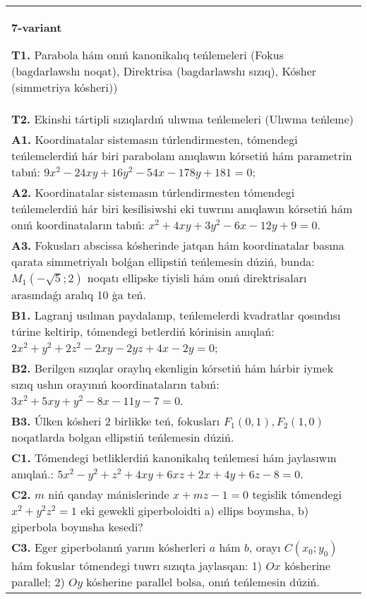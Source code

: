 \documentclass{article}
\begin{document}
\begin{tabular}{m{17cm}}
\textbf{7-variant}
\newline

\textbf{T1.} Parabola hám onıń kanonikalıq teńlemeleri (Fokus (bagdarlawshı noqat), Direktrisa (bagdarlawshı sızıq), Kósher (simmetriya kósheri)) \\
\textbf{T2.} Ekinshi tártipli sızıqlardıń ulıwma teńlemeleri (Ulıwma teńleme) \\
\textbf{A1.} Koordinatalar sistemasın túrlendirmesten, tómendegi teńlemelerdiń hár biri parabolanı anıqlawın kórsetiń hám parametrin tabıń: $9 x^2-24 x y+16 y^2-54 x-178 y+181=0$; \\
\textbf{A2.} Koordinatalar sistemasın túrlendirmesten tómendegi teńlemelerdiń hár biri kesilisiwshi eki tuwrını anıqlawın kórsetiń hám onıń koordinataların tabıń: $x^2+4 x y+3 y^2-6 x-12 y+9=0$. \\
\textbf{A3.} Fokusları abscissa kósherinde jatqan hám koordinatalar basına qarata simmetriyalı bolǵan ellipstiń teńlemesin dúziń, bunda: $M_1 (-\sqrt{5}; 2)$ noqatı ellipske tiyisli hám onıń direktrisaları arasındaǵı aralıq 10 ģa teń. \\
\textbf{B1.} Lagranj usılınan paydalanıp, teńlemelerdi kvadratlar qosındısı túrine keltirip, tómendegi betlerdiń kórinisin anıqlań: $2 x^2+y^2+2 z^2-2 x y-2 y z+4 x-2 y=0$; \\
\textbf{B2.} Berilgen sızıqlar oraylıq ekenligin kórsetiń hám hárbir iymek sızıq ushın orayınıń koordinataların tabıń: $3x^2+5xy+y^2-8x-11y-7=0$. \\
\textbf{B3.} Úlken kósheri 2 birlikke teń, fokusları $F_1 (0,1), F_2 (1,0) $ noqatlarda bolgan ellipstiń teńlemesin dúziń. \\
\textbf{C1.} Tómendegi betliklerdiń kanonikalıq teńlemesi hám jaylasıwın anıqlań.: $5 x^2-y^2+z^2+4 x y+6 x z+2 x+4 y+6 z-8=0$. \\
\textbf{C2.} $m$ niń qanday mánislerinde $x+mz-1=0$ tegislik tómendegi $x^2+y^2z^2=1$ eki gewekli giperboloidti a) ellips boyınsha, b) giperbola boyınsha kesedi? \\
\textbf{C3.} Eger giperbolanıń yarım kósherleri $a$ hám $b$, orayı $C\left(x_0; y_0\right) $ hám fokuslar tómendegi tuwrı sızıqta jaylasqan: 1) $O x$ kósherine parallel; 2) $O y$ kósherine parallel bolsa, onıń teńlemesin dúziń. \\

\end{tabular}
\vspace{1cm}
\end{document}
